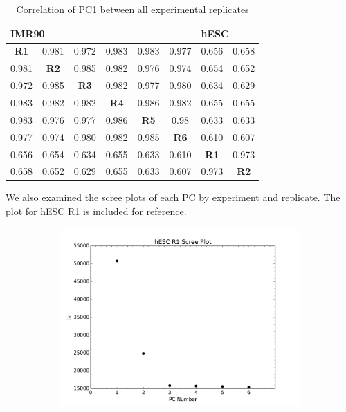 \begin{table}[h]
  \centering
  \caption{Correlation of PC1 between all experimental replicates}\label{table:PC1Correlations}
  \begin{tabularx}{\textwidth}{@{}cccccccc@{}}
    \toprule
    \multicolumn{6}{l}{IMR90} & \multicolumn{2}{l}{hESC} \\
    \midrule
    \textbf{R1} & 0.981       & 0.972       & 0.983       & 0.983       & 0.977       & 0.656       & 0.658 \\
    0.981       & \textbf{R2} & 0.985       & 0.982       & 0.976       & 0.974       & 0.654       & 0.652 \\
    0.972       & 0.985       & \textbf{R3} & 0.982       & 0.977       & 0.980       & 0.634       & 0.629 \\
    0.983       & 0.982       & 0.982       & \textbf{R4} & 0.986       & 0.982       & 0.655       & 0.655 \\
    0.983       & 0.976       & 0.977       & 0.986       & \textbf{R5} & 0.98        & 0.633       & 0.633 \\
    0.977       & 0.974       & 0.980       & 0.982       & 0.985       & \textbf{R6} & 0.610       & 0.607 \\
    0.656       & 0.654       & 0.634       & 0.655       & 0.633       & 0.610       & \textbf{R1} & 0.973  \\
    0.658       & 0.652       & 0.629       & 0.655       & 0.633       & 0.607       & 0.973       & \textbf{R2}    \\
    \bottomrule
  \end{tabularx}
\end{table}

We also examined the scree plots of each \gls{PC} by experiment and replicate.  The plot for hESC R1 is included for reference.

\begin{figure}
  \centering

  \begin{subfigure}[b]{0.45\textwidth}
    \centering
    \includegraphics[width=\textwidth]{./fig/supplementary/hESC-R1-scree.png}\label{fig:hESCScree}
  \end{subfigure}

\end{figure}

